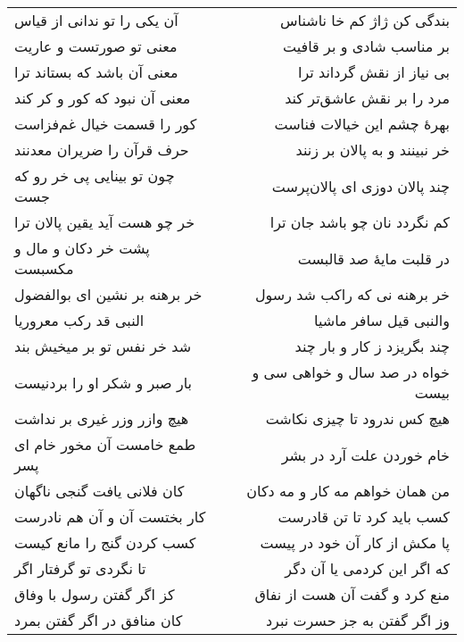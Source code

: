 \begin{center}
\begin{longtable}{l p{0.5cm} r}
آن یکی را تو ندانی از قیاس
&&
بندگی کن ژاژ کم خا ناشناس
\\
معنی تو صورتست و عاریت
&&
بر مناسب شادی و بر قافیت
\\
معنی آن باشد که بستاند ترا
&&
بی نیاز از نقش گرداند ترا
\\
معنی آن نبود که کور و کر کند
&&
مرد را بر نقش عاشق‌تر کند
\\
کور را قسمت خیال غم‌فزاست
&&
بهرهٔ چشم این خیالات فناست
\\
حرف قرآن را ضریران معدنند
&&
خر نبینند و به پالان بر زنند
\\
چون تو بینایی پی خر رو که جست
&&
چند پالان دوزی ای پالان‌پرست
\\
خر چو هست آید یقین پالان ترا
&&
کم نگردد نان چو باشد جان ترا
\\
پشت خر دکان و مال و مکسبست
&&
در قلبت مایهٔ صد قالبست
\\
خر برهنه بر نشین ای بوالفضول
&&
خر برهنه نی که راکب شد رسول
\\
النبی قد رکب معروریا
&&
والنبی قیل سافر ماشیا
\\
شد خر نفس تو بر میخیش بند
&&
چند بگریزد ز کار و بار چند
\\
بار صبر و شکر او را بردنیست
&&
خواه در صد سال و خواهی سی و بیست
\\
هیچ وازر وزر غیری بر نداشت
&&
هیچ کس ندرود تا چیزی نکاشت
\\
طمع خامست آن مخور خام ای پسر
&&
خام خوردن علت آرد در بشر
\\
کان فلانی یافت گنجی ناگهان
&&
من همان خواهم مه کار و مه دکان
\\
کار بختست آن و آن هم نادرست
&&
کسب باید کرد تا تن قادرست
\\
کسب کردن گنج را مانع کیست
&&
پا مکش از کار آن خود در پیست
\\
تا نگردی تو گرفتار اگر
&&
که اگر این کردمی یا آن دگر
\\
کز اگر گفتن رسول با وفاق
&&
منع کرد و گفت آن هست از نفاق
\\
کان منافق در اگر گفتن بمرد
&&
وز اگر گفتن به جز حسرت نبرد
\\
\end{longtable}
\end{center}
